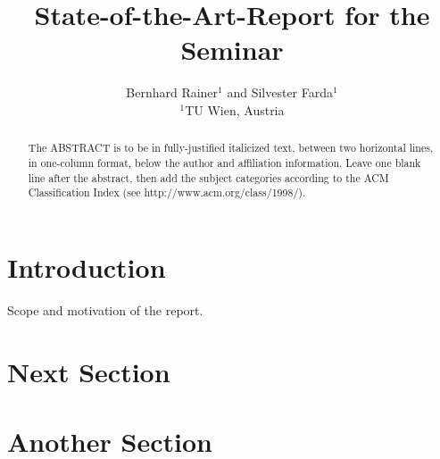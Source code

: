 \documentclass{egpubl}
\title[Seminar Report]{State-of-the-Art-Report for the Seminar}
\author[B. Rainer \& S. Farda]
       {Bernhard Rainer$^{1}$ and Silvester Farda$^{1}$
        \\
         $^1$TU Wien, Austria}
\begin{document}


\maketitle

\begin{abstract}
   The ABSTRACT is to be in fully-justified italicized text, 
   between two horizontal lines,
   in one-column format, 
   below the author and affiliation information.
   Leave one blank line after the abstract, 
   then add the subject categories according to the ACM Classification Index 
   (see http://www.acm.org/class/1998/).

\begin{classification} %
\end{classification}

\end{abstract}



\section{Introduction}

Scope and motivation of the report.

\section{Next Section}




\section{Another Section}





\end{document}
